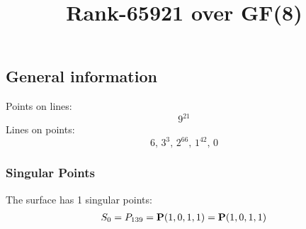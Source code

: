 \documentclass{article}
\newcommand\setTBstruts{\def\T{\rule{0pt}{2.6ex}}%
\def\B{\rule[-1.2ex]{0pt}{0pt}}}
\newcommand{\bP}{{\bf P}}
\begin{document}
 
\setTBstruts



{\allowdisplaybreaks%






\title{Rank-65921 over GF(8)}
\author{}%
\maketitle%
%
{}



\subsection*{General information}
Points on lines:
$$
9^{21}$$
Lines on points:
$$
6,\,3^3,\,2^{66},\,1^{42},\,0$$
\subsubsection*{Singular Points}
The surface has 1 singular points:\\
\begin{align*}
S_{0} &= P_{139}=\bP(1, 0, 1, 1) = \bP(1, 0, 1, 1)\\
\end{align*}
}
\end{document}
